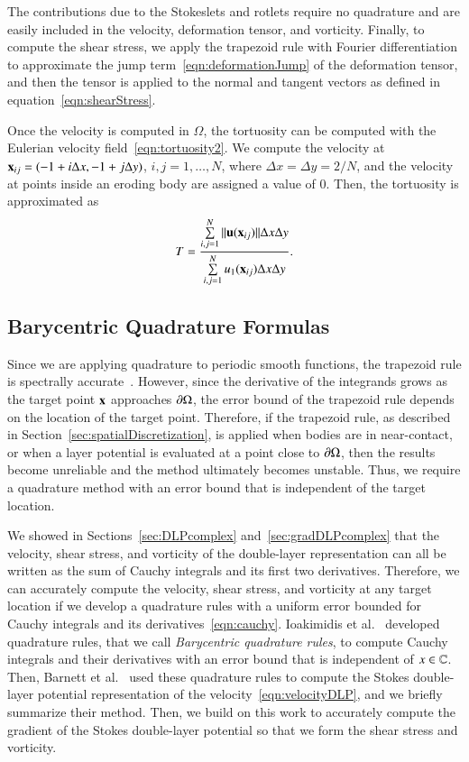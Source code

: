 \documentclass[preprint,10pt]{elsarticle}
\begin{document}
The contributions due to the Stokeslets and rotlets require no
quadrature and are easily included in the velocity, deformation tensor,
and vorticity.  Finally, to compute the shear stress, we apply the
trapezoid rule with Fourier differentiation to approximate the jump
term~\eqref{eqn:deformationJump} of the deformation tensor, and then the
tensor is applied to the normal and tangent vectors as defined in
equation~\eqref{eqn:shearStress}.

Once the velocity is computed in $\Omega$, the tortuosity can be
computed with the Eulerian velocity field~\eqref{eqn:tortuosity2}.  We
compute the velocity at ${\mathbf{x}}_{ij} = (-1 + i\Delta x, -1 + j\Delta y)$,
$i,j=1,\ldots,N$, where $\Delta x = \Delta y = 2/N$, and the velocity at
points inside an eroding body are assigned a value of 0.  Then, the
tortuosity is approximated as
\begin{align}
  T = \frac{\sum\limits_{i,j=1}^N \|{\mathbf{u}}({\mathbf{x}}_{ij})\|\Delta x \Delta y}
      {\sum\limits_{i,j=1}^N u_1({\mathbf{x}}_{ij}) \Delta x \Delta y}.
\end{align}

\subsection{Barycentric Quadrature Formulas}
\label{sec:bary}
Since we are applying quadrature to periodic smooth functions, the
trapezoid rule is spectrally accurate~\cite{tre-wei2014}. However, since
the derivative of the integrands grows as the target point ${\mathbf{x}}$
approaches ${\partial}\Omega$, the error bound of the trapezoid rule depends on
the location of the target point. Therefore, if the trapezoid rule, as
described in Section~\ref{sec:spatialDiscretization}, is applied when
bodies are in near-contact, or when a layer potential is evaluated at a
point close to ${\partial}\Omega$, then the results become unreliable and the
method ultimately becomes unstable.  Thus, we require a quadrature
method with an error bound that is independent of the target location.

We showed in Sections~\ref{sec:DLPcomplex} and~\ref{sec:gradDLPcomplex}
that the velocity, shear stress, and vorticity of the double-layer
representation can all be written as the sum of Cauchy integrals and its
first two derivatives.  Therefore, we can accurately compute the
velocity, shear stress, and vorticity at any target location if we
develop a quadrature rules with a uniform error bounded for Cauchy
integrals and its derivatives~\eqref{eqn:cauchy}.  Ioakimidis et
al.~\cite{ioa-pap-per1991} developed quadrature rules, that we call {\em
Barycentric quadrature rules}, to compute Cauchy integrals and their
derivatives with an error bound that is independent of $x \in {\mathbb{C}}$.
Then, Barnett et al.~\cite{bar-wu-vee2015} used these quadrature rules
to compute the Stokes double-layer potential representation of the
velocity~\eqref{eqn:velocityDLP}, and we briefly summarize their method.
Then, we build on this work to accurately compute the gradient of the
Stokes double-layer potential so that we form the shear stress and
vorticity.
\end{document}
